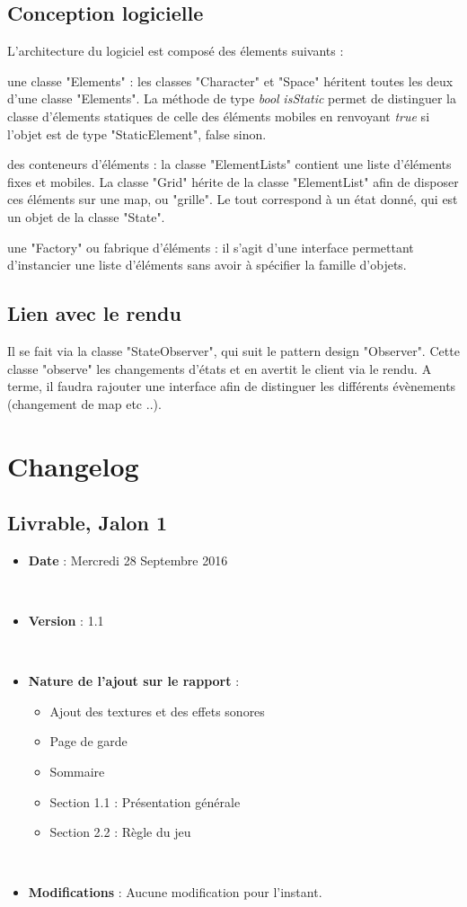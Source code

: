 \documentclass[12pt,a4paper]{report}
\begin{document}
    	\section{Conception logicielle}
	L'architecture du logiciel est composé des élements suivants :
	\item une classe "Elements" : les classes "Character" et "Space" héritent toutes les deux d'une classe "Elements". La méthode de type \textit{bool} \textit{isStatic} permet de distinguer la classe d'élements statiques de celle des éléments mobiles en renvoyant \textit{true} si l'objet est de type "StaticElement", false sinon.
	\item des conteneurs d'éléments : la classe "ElementLists" contient une liste d'éléments fixes et mobiles. La classe "Grid" hérite de la classe "ElementList" afin de disposer ces éléments sur une map, ou "grille". Le tout correspond à un état donné, qui est un objet de la classe "State".
	\item une "Factory" ou fabrique d'éléments : il s'agit d'une interface permettant d'instancier une liste d'éléments sans avoir à spécifier la famille d'objets.
    
	\section{Lien avec le rendu}
	Il se fait via la classe "StateObserver", qui suit le pattern design "Observer". Cette classe "observe" les changements d'états et en avertit le client via le rendu. A terme, il faudra rajouter une interface afin de distinguer les différents évènements (changement de map etc ..).    

    \chapter{Changelog}
    \section{Livrable, Jalon 1}
    \begin{itemize}
\item \textbf{Date}  : Mercredi 28 Septembre 2016

\par\leavevmode\
\item \textbf{Version}  : 1.1

\par\leavevmode\
\item \textbf{Nature de l'ajout sur le rapport}  : \begin{itemize}\item Ajout des textures et des effets sonores \item Page de garde \item Sommaire \item Section 1.1 : Présentation générale \item Section 2.2 : Règle du jeu \end{itemize}

\par\leavevmode\
\item \textbf{Modifications}  : Aucune modification pour l'instant.\end{itemize}
    
    
\end{document}
